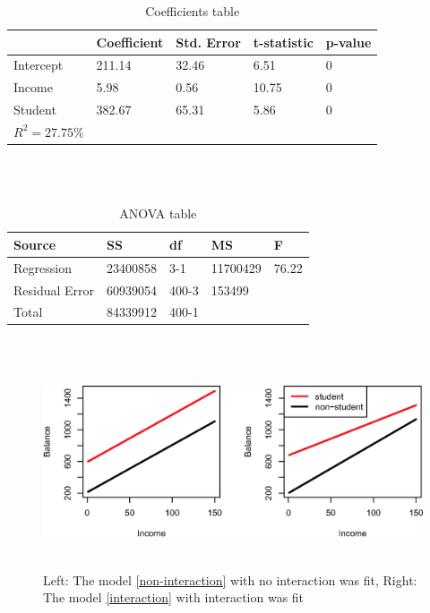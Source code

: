     \documentclass[12pt,fleqn,a4paper]{article}%
\theoremstyle{definition}
\theoremstyle{plain}
\numberwithin{equation}{section}
\begin{document}
\begin{table}[H]
\centering
\begin{tabular}{l|llll}
  & Coefficient   & Std. Error     & t-statistic  & p-value \\
\hline
Intercept & 211.14 & 32.46 & 6.51  & 0 \\
Income    & 5.98   & 0.56  & 10.75 & 0 \\
Student   & 382.67 & 65.31 & 5.86  & 0 \\
\bottomrule
$R^{2}=27.75\% $ & & & & \\
\end{tabular}
\\~\\
\caption{Coefficients table}\label{Table}
\end{table}

\begin{table}[H]
\centering
\begin{tabular}{l|llll}
Source         & SS  		 & df    & MS  		& F \\
\hline
Regression     & 23400858    & 3-1   & 11700429 & 76.22  \\
Residual Error & 60939054    & 400-3 & 153499   &   \\
Total          & 84339912    & 400-1 &     		&   \\
\bottomrule
\end{tabular}
\\~\\
\caption{ANOVA table}\label{Table}
\end{table}

\begin{figure}[H]
\centering
\includegraphics[scale=0.9]{images//3_7.eps}
\\~\\
\caption{Left: The model \eqref{non-interaction} with no interaction was fit, Right: The model \eqref{interaction} with interaction was fit }\label{figure-3.7}
\end{figure}
\end{document}

